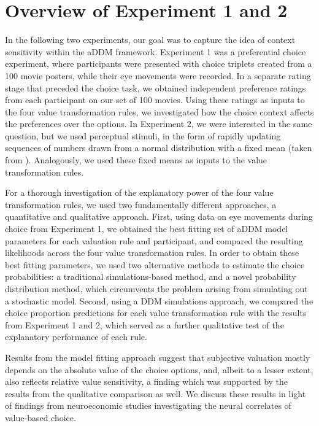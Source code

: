 \documentclass[11pt,a4paper]{article}
\begin{document}
\section{Overview of Experiment 1 and 2}

In the following two experiments, our goal was to capture the idea of context sensitivity within the aDDM framework. Experiment 1 was a preferential choice experiment, where participants were presented with choice triplets created from a 100 movie posters, while their eye movements were recorded. In a separate rating stage that preceded the choice task, we obtained independent preference ratings from each participant on our set of 100 movies. Using these ratings as inputs to the four value transformation rules, we investigated how the choice context affects the preferences over the options. In Experiment 2, we were interested in the same question, but we used perceptual stimuli, in the form of rapidly updating sequences of numbers drawn from a normal distribution with a fixed mean (taken from ). Analogously, we used these fixed means as inputs to the value transformation rules.


For a thorough investigation of the explanatory power of the four value transformation rules, we used two fundamentally different approaches, a quantitative and qualitative approach. First, using data on eye movements during choice from Experiment 1, we obtained the best fitting set of aDDM model parameters for each valuation rule and participant, and compared the resulting likelihoods across the four value transformation rules. In order to obtain these best fitting parameters, we used two alternative methods to estimate the choice probabilities: a traditional simulations-based method, and a novel probability distribution method, which circumvents the problem arising from simulating out a stochastic model. Second, using a DDM simulations approach, we compared the choice proportion predictions for each value transformation rule with the results from Experiment 1 and 2, which served as a further qualitative test of the explanatory performance of each rule. 

Results from the model fitting approach suggest that subjective valuation mostly depends on the absolute value of the choice options, and, albeit to a lesser extent, also reflects  relative value sensitivity, a finding which was supported by the results from the qualitative comparison as well. We discuss these results in light of findings from neuroeconomic studies investigating the neural correlates of value-based choice.
\end{document}

